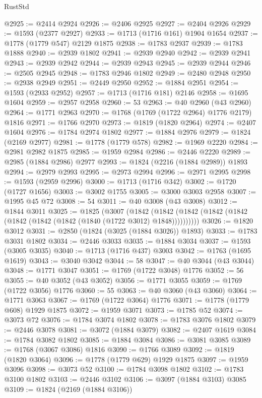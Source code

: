 \begin{lexlean}{RustStd}
\begin{coremodule}
{\begin{coremodule}
{{{{{{{{{{{{{{{{{{{{{{{{{{{{{{{{{{{{{{{{{{{{{{{@2925 := @2414 @2924
@2926 := @2406 @2925
@2927 := @2404 @2926
@2929 := @1593 (@2377 @2927)
@2933 := @1713 (@1716 @161) @1904 @1654
@2937 := @1778 (@1779 @547) @2129 @1875
@2938 := @1783 @2937
@2939 := @1783 @1888
@2940 := @2939 @1802
@2941 := @2939 @2940
@2942 := @2939 @2941
@2943 := @2939 @2942
@2944 := @2939 @2943
@2945 := @2939 @2944
@2946 := @2505 @2945
@2948 := @1783 @2946 @1802
@2949 := @2480 @2948
@2950 := @2938 @2949
@2951 := @2449 @2950
@2952 := @1884 @2951
@2954 := @1593 (@2933 @2952)
@2957 := @1713 (@1716 @181) @2146
@2958 := @1695 @1604
@2959 := @2957 @2958
@2960 := 53
@2963 := @40 @2960 (@43 @2960)
@2964 := @1771 @2963
@2970 := @1768 (@1769 (@1722 @2964) @1776 @2179) @1816
@2971 := @1766 @2970
@2973 := @1819 (@1820 @2964)
@2974 := @2407 @1604
@2976 := @1784 @2974 @1802
@2977 := @1884 @2976
@2979 := @1824 (@2169 @2977)
@2981 := @1778 (@1779 @578)
@2982 := @1969 @2220
@2984 := @2981 @2982 @1875
@2985 := @1959 @2984
@2986 := @2446 @2220
@2989 := @2985 (@1884 @2986) @2977
@2993 := @1824 (@2216 (@1884 @2989)) @1893
@2994 := @2979 @2993
@2995 := @2973 @2994
@2996 := @2971 @2995
@2998 := @1593 (@2959 @2996)
@3000 := @1713 (@1716 @342)
@3002 := @1720 (@1727 @1656)
@3003 := @3002 @1755
@3005 := @3000 @3003 @2958
@3007 := @1995 @45 @72
@3008 := 54
@3011 := @40 @3008 (@43 @3008)
@3012 := @1844 @3011
@3025 := @1825
    (@3007
      (@1842 (@1842 (@1842 (@1842 (@1842 (@1842 (@1842 (@1842 (@1840 (@1722 @3012) @1848))))))))))
@3026 := @1820 @3012
@3031 := @2850 (@1824 (@3025 (@1884 @3026)) @1893)
@3033 := @1783 @3031 @1802
@3034 := @2446 @3033
@3035 := @1884 @3034
@3037 := @1593 (@3005 @3035)
@3040 := @1713 (@1716 @437) @3003
@3042 := @1763 (@1695 @1619)
@3043 := @3040 @3042
@3044 := 58
@3047 := @40 @3044 (@43 @3044)
@3048 := @1771 @3047
@3051 := @1769 (@1722 @3048) @1776
@3052 := 56
@3055 := @40 @3052 (@43 @3052)
@3056 := @1771 @3055
@3059 := @1769 (@1722 @3056) @1776
@3060 := 55
@3063 := @40 @3060 (@43 @3060)
@3064 := @1771 @3063
@3067 := @1769 (@1722 @3064) @1776
@3071 := @1778 (@1779 @608) @1929 @1875
@3072 := @1959 @3071
@3073 := @1785 @52
@3074 := @3073 @72
@3076 := @1784 @3074 @1802
@3078 := @1783 @3076 @1802
@3079 := @2446 @3078
@3081 := @3072 (@1884 @3079)
@3082 := @2407 @1619
@3084 := @1784 @3082 @1802
@3085 := @1884 @3084
@3086 := @3081 @3085
@3089 := @1768 (@3067 @3086) @1816
@3090 := @1766 @3089
@3092 := @1819 (@1820 @3064)
@3096 := @1778 (@1779 @629) @1929 @1875
@3097 := @1959 @3096
@3098 := @3073 @52
@3100 := @1784 @3098 @1802
@3102 := @1783 @3100 @1802
@3103 := @2446 @3102
@3106 := @3097 (@1884 @3103) @3085
@3109 := @1824 (@2169 (@1884 @3106))
}}}}}}}}}}}}}}}}}}}}}}}}}}}}}}}}}}}}}}}}}}}}}}}
\end{coremodule}}
\end{coremodule}
\end{lexlean}
